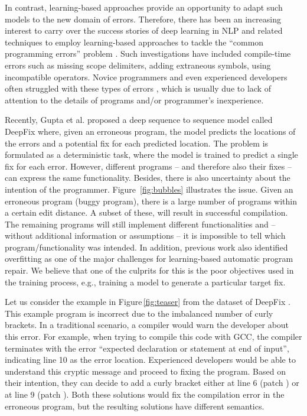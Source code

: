 \documentclass[runningheads]{llncs}
\newcommand{\figref}{Figure}
\begin{document}
In contrast, learning-based approaches provide an opportunity to adapt such models to the new domain of errors. Therefore, there has been an increasing interest to carry over the success stories of deep learning in NLP and related techniques to employ learning-based approaches to tackle the ``common programming errors'' problem \cite{Gupta2017DeepFixFC,gupta2019RLAssist}. Such investigations have included compile-time errors such as missing scope delimiters, adding extraneous symbols, using incompatible operators. Novice programmers and even experienced developers often struggled with these types of errors \cite{seo2014programmers}, which is usually due to lack of attention to the details of programs and/or programmer's inexperience. 

 Recently, Gupta et al. \cite{Gupta2017DeepFixFC} proposed a deep sequence to sequence model called DeepFix where, given an erroneous program, the model predicts the locations of the errors and a potential fix for each predicted location. The problem is formulated as a deterministic task, where the model is trained to predict a single fix for each error. However, different programs -- and therefore also their fixes -- can express the same functionality. Besides, there is also uncertainty about the intention of the programmer.
 \figref \, \ref{fig:bubbles} illustrates the issue. Given an erroneous program (buggy program), there is a large number of programs within a certain edit distance. A subset of these, will result in successful compilation. The remaining programs will still implement different functionalities and -- without additional information or assumptions -- it is impossible to tell which program/functionality was intended.
 In addition, previous work \cite{SmithBGB15} also identified overfitting as one of the major challenges for learning-based automatic program repair. We believe that one of the culprits for this is the poor objectives used in the training process, e.g., training a model to generate a particular target fix.
 
 Let us consider the example in \figref \,\ref{fig:teaser} from the dataset of DeepFix \cite{Gupta2017DeepFixFC}. This example program is incorrect due to the imbalanced number of curly brackets. In a traditional scenario, a compiler would warn the developer about this error. For example, when trying to compile this code with GCC, the compiler terminates with the error ``expected declaration or statement at end of input'', indicating line 10 as the error location. Experienced developers would be able to understand this cryptic message and proceed to fixing the program. Based on their intention, they can decide to add a curly bracket either at line 6 (patch ) or at line 9 (patch ). Both these solutions would fix the compilation error in the erroneous program, but the resulting solutions have different semantics. 
 
\end{document}
